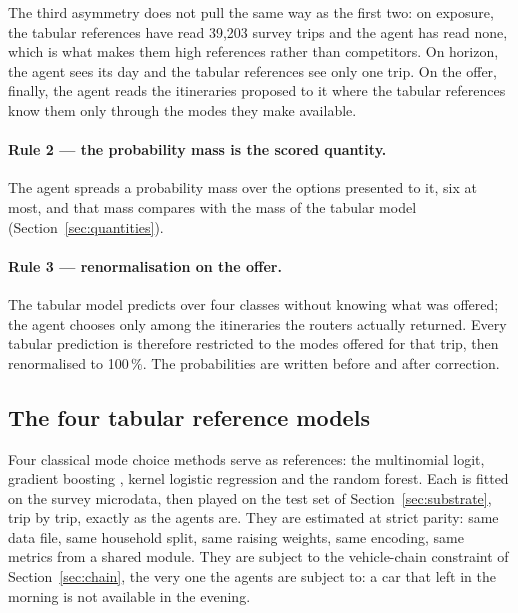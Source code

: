 The third asymmetry does not pull the same way as the first two: on exposure, the tabular references have read 39,203 survey trips and the agent has read none, which is what makes them high references rather than competitors.
On horizon, the agent sees its day and the tabular references see only one trip. On the offer, finally, the agent reads the itineraries proposed to it where the tabular references know them only through the modes they make available.

\paragraph{Rule 2 — the probability mass is the scored quantity.} The agent spreads a probability mass over the options presented to it, six at most, and that mass compares with the mass of the tabular model (Section~\ref{sec:quantities}).

\paragraph{Rule 3 — renormalisation on the offer.} The tabular model predicts over four classes without knowing what was offered; the agent chooses only among the itineraries the routers actually returned. Every tabular prediction is therefore restricted to the modes offered for that trip, then renormalised to 100\,\%. The probabilities are written before and after correction. %

\subsection{The four tabular reference models}
\label{sec:references}

Four classical mode choice methods serve as references: the multinomial logit, gradient boosting \citep{ke2017lightgbm}, kernel logistic regression and the random forest. Each is fitted on the survey microdata, then played on the test set of Section~\ref{sec:substrate}, trip by trip, exactly as the agents are. They are estimated at strict parity: same data file, same household split, same raising weights, same encoding, same metrics from a shared module. They are subject to the vehicle-chain constraint of Section~\ref{sec:chain}, the very one the agents are subject to: a car that left in the morning is not available in the evening.

